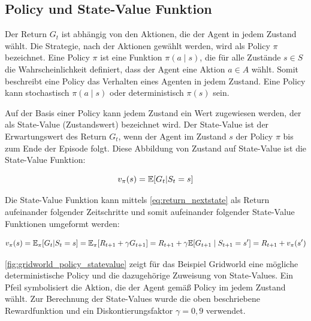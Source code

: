 \subsection{Policy und State-Value Funktion}
\label{sec:policy_statevalue}

Der Return $G_t$ ist abhängig von den Aktionen, die der Agent in jedem Zustand wählt. 
Die Strategie, nach der Aktionen gewählt werden, wird als Policy $\pi$ bezeichnet.
Eine Policy $\pi$ ist eine Funktion $\pi(a \mid s)$, die für alle Zustände $s \in S$ die Wahrscheinlichkeit definiert, dass der Agent eine Aktion $a \in A$ wählt. 
Somit beschreibt eine Policy das Verhalten eines Agenten in jedem Zustand. 
Eine Policy kann stochastisch $\pi(a \mid s)$ oder deterministisch $\pi (s)$ sein. \cite[S. 58]{suttonReinforcementLearningIntroduction2018}

Auf der Basis einer Policy kann jedem Zustand ein Wert zugewiesen werden, der als State-Value (\dt Zustandswert) bezeichnet wird. 
Der State-Value ist der Erwartungswert des Return $G_t$, wenn der Agent im Zustand $s$ der Policy $\pi$ bis zum Ende der Episode folgt. 
Diese Abbildung von Zustand auf State-Value ist die State-Value Funktion:

\begin{equation}
    \label{eq:statevalue_function}
    \equationentry{Definition State-Value Funktion}
    v_{\pi}(s)=\mathbb{E}[G_t|S_t=s]
\end{equation}

Die State-Value Funktion kann mittels \cref{eq:return_nextstate} als Return aufeinander folgender Zeitschritte und somit aufeinander folgender State-Value Funktionen umgeformt werden:

\begin{equation}
    \label{eq:statevalue_relation}
    \equationentry{Beziehung zwischen State-Value Funktionen aufeinander folgender Zeitschritte}
    v_{\pi}(s)=\mathbb{E}_\pi[G_t|S_t=s] = \mathbb{E}_\pi[R_{t+1}+\gamma G_{t+1}]= R_{t+1} + \gamma \mathbb{E}[G_{t+1} \mid S_{t+1}=s']=R_{t+1}+v_\pi(s')
\end{equation}

\cref{fig:gridworld_policy_statevalue} zeigt für das Beispiel Gridworld eine mögliche deterministische Policy und die dazugehörige Zuweisung von State-Values. Ein Pfeil symbolisiert die Aktion, die der Agent gemäß Policy im jedem Zustand wählt. Zur Berechnung der State-Values wurde die oben beschriebene Rewardfunktion und ein Diskontierungsfaktor $\gamma=0,9$ verwendet.


